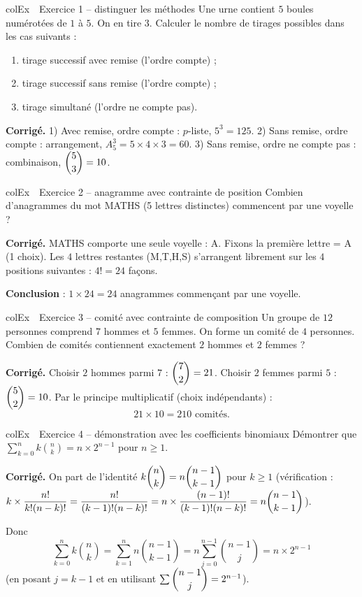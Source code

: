 \documentclass[11pt,a4paper]{article}
\newenvironment{exemple}[1][Exemple]
  {\begin{fiche}{colEx}{\ding{217}~~#1}}{\end{fiche}}
\begin{document}
\begin{exemple}[Exercice 1 -- distinguer les méthodes]
Une urne contient $5$ boules numérotées de $1$ à $5$. On en tire $3$. Calculer le nombre de tirages possibles dans les cas suivants :
\begin{enumerate}[leftmargin=7mm, itemsep=0.3mm]
  \item tirage successif avec remise (l'ordre compte) ;
  \item tirage successif sans remise (l'ordre compte) ;
  \item tirage simultané (l'ordre ne compte pas).
\end{enumerate}

\smallskip
\textbf{Corrigé.} 1) Avec remise, ordre compte : $p$-liste, $5^3=125$. 2) Sans remise, ordre compte : arrangement, $A_5^3=5\times4\times3=60$. 3) Sans remise, ordre ne compte pas : combinaison, $\dbinom53=10$.
\end{exemple}

\begin{exemple}[Exercice 2 -- anagramme avec contrainte de position]
Combien d'anagrammes du mot MATHS (5 lettres distinctes) commencent par une voyelle ?

\smallskip
\textbf{Corrigé.} MATHS comporte une seule voyelle : A. Fixons la première lettre = A (1 choix). Les $4$ lettres restantes (M,T,H,S) s'arrangent librement sur les $4$ positions suivantes : $4!=24$ façons.

\smallskip
\textbf{Conclusion} : $1\times24=24$ anagrammes commençant par une voyelle.
\end{exemple}

\begin{exemple}[Exercice 3 -- comité avec contrainte de composition]
Un groupe de $12$ personnes comprend $7$ hommes et $5$ femmes. On forme un comité de $4$ personnes. Combien de comités contiennent exactement $2$ hommes et $2$ femmes ?

\smallskip
\textbf{Corrigé.} Choisir $2$ hommes parmi $7$ : $\dbinom72=21$. Choisir $2$ femmes parmi $5$ : $\dbinom52=10$. Par le principe multiplicatif (choix indépendants) :
\[
  21\times10 = 210 \text{ comités}.
\]
\end{exemple}

\begin{exemple}[Exercice 4 -- démonstration avec les coefficients binomiaux]
Démontrer que $\displaystyle\sum_{k=0}^nk\binom nk = n\times2^{n-1}$ pour $n\geq1$.

\smallskip
\textbf{Corrigé.} On part de l'identité $k\dbinom nk=n\dbinom{n-1}{k-1}$ pour $k\geq1$ (vérification : $k\times\dfrac{n!}{k!(n-k)!}=\dfrac{n!}{(k-1)!(n-k)!}=n\times\dfrac{(n-1)!}{(k-1)!(n-k)!}=n\dbinom{n-1}{k-1}$).

\smallskip
Donc
\[
  \sum_{k=0}^nk\binom nk = \sum_{k=1}^nn\binom{n-1}{k-1} = n\sum_{j=0}^{n-1}\binom{n-1}j = n\times2^{n-1}
\]
(en posant $j=k-1$ et en utilisant $\sum\dbinom{n-1}j=2^{n-1}$).
\end{exemple}
\end{document}
